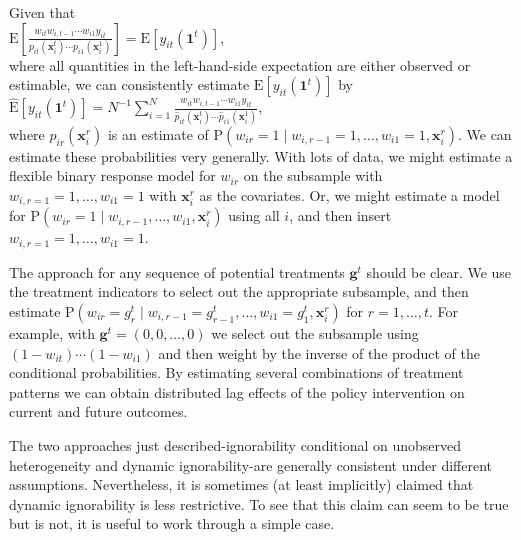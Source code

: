 \documentclass[10pt]{article}
\begin{document}
Given that\\
$\mathrm{E}\left[\frac{w_{i t} w_{i, t-1} \cdots w_{i 1} y_{i t}}{p_{i t}\left(\mathbf{x}_{i}^{t}\right) \cdots p_{i 1}\left(\mathbf{x}_{i}^{1}\right)}\right]=\mathrm{E}\left[y_{i t}\left(\mathbf{1}^{t}\right)\right]$,\\
where all quantities in the left-hand-side expectation are either observed or estimable, we can consistently estimate $\mathrm{E}\left[y_{i t}\left(\mathbf{1}^{t}\right)\right]$ by\\
$\hat{\mathrm{E}}\left[y_{i t}\left(\mathbf{1}^{t}\right)\right]=N^{-1} \sum_{i=1}^{N} \frac{w_{i t} w_{i, t-1} \cdots w_{i 1} y_{i t}}{\hat{p}_{i t}\left(\mathbf{x}_{i}^{t}\right) \cdots \hat{p}_{i 1}\left(\mathbf{x}_{i}^{1}\right)}$,\\
where $\hat{p}_{i r}\left(\mathbf{x}_{i}^{r}\right)$ is an estimate of $\mathrm{P}\left(w_{i r}=1 \mid w_{i, r-1}=1, \ldots, w_{i 1}=1, \mathbf{x}_{i}^{r}\right)$. We can estimate these probabilities very generally. With lots of data, we might estimate a flexible binary response model for $w_{i r}$ on the subsample with $w_{i, r=1}=1, \ldots, w_{i 1}=1$ with $\mathbf{x}_{i}^{r}$ as the covariates. Or, we might estimate a model for $\mathrm{P}\left(w_{i r}=1 \mid w_{i, r-1}, \ldots, w_{i 1}, \mathbf{x}_{i}^{r}\right)$ using all $i$, and then insert $w_{i, r=1}=1, \ldots, w_{i 1}=1$.

The approach for any sequence of potential treatments $\mathbf{g}^{t}$ should be clear. We use the treatment indicators to select out the appropriate subsample, and then estimate $\mathrm{P}\left(w_{i r}=g_{r}^{t} \mid w_{i, r-1}=g_{r-1}^{t}, \ldots, w_{i 1}=g_{1}^{t}, \mathbf{x}_{i}^{r}\right)$ for $r=1, \ldots, t$. For example, with $\mathbf{g}^{t}=(0,0, \ldots, 0)$ we select out the subsample using $\left(1-w_{i t}\right) \cdots\left(1-w_{i 1}\right)$ and then weight by the inverse of the product of the conditional probabilities. By estimating several combinations of treatment patterns we can obtain distributed lag effects of the policy intervention on current and future outcomes.

The two approaches just described-ignorability conditional on unobserved heterogeneity and dynamic ignorability-are generally consistent under different assumptions. Nevertheless, it is sometimes (at least implicitly) claimed that dynamic ignorability is less restrictive. To see that this claim can seem to be true but is not, it is useful to work through a simple case.
\end{document}
